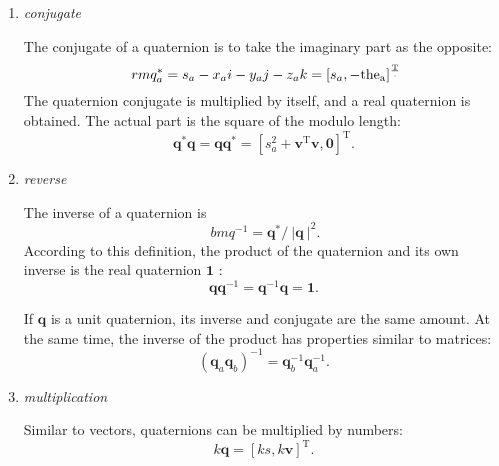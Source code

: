 \begin{enumerate}
	\item { \emph {conjugate} }
	
	The conjugate of a quaternion is to take the imaginary part as the opposite:
	\begin{equation}
	\ rm{q}_a ^ * = s_a - x_ai - y_aj - z_ak = [s_a, - \rm{the}_a] ^ \frac{T}.
	\end{equation}
	The quaternion conjugate is multiplied by itself, and a real quaternion is obtained. The actual part is the square of the modulo length:
	\begin{equation}
	\bm{q}^* \bm{q} = \bm{q} \bm{q}^* = [s_a^2+\bm{v}^\mathrm{T} \bm{v}, \bm{0} ]^\mathrm{T}.
	\end{equation}

	\item { \emph{reverse} }
	
	The inverse of a quaternion is
	\begin{equation}
	\label{eq:quaternionInverse}
	\ bm{q} ^ { - 1 } = \bm{q} ^ * / \ | \bm{q} \ | ^ 2 .       
	\end{equation}
	According to this definition, the product of the quaternion and its own inverse is the real quaternion $ \bm {1} $ :
	\begin{equation}
	\bm{q} \bm{q}^{-1} = \bm{q}^{-1} \bm{q} = \bm{1}.
	\end{equation}
	
	If $ \bm{q} $ is a unit quaternion, its inverse and conjugate are the same amount. At the same time, the inverse of the product has properties similar to matrices:
	\begin{equation}
	\left( \bm{q}_a \bm{q}_b \right)^{-1} = \bm{q}_b^{-1} \bm{q}_a^{-1}.
	\end{equation}
	
	\item { \emph {multiplication} }
	
	Similar to vectors, quaternions can be multiplied by numbers:
	\begin{equation}
	k \bm{q} = \left[ ks, k\bm{v} \right]^\mathrm{T}.
	\end{equation}
\end{enumerate}